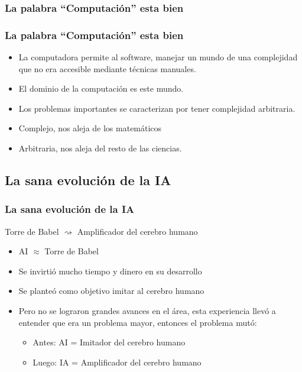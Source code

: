 \documentclass{beamer}
\begin{document}
\subsubsection{La palabra ``Computaci\'on''  esta bien}
    \begin{frame}
      \frametitle{La palabra ``Computaci\'on''  esta bien}
      \begin{itemize}
	\item La computadora permite al software, manejar un mundo de una complejidad que no era accesible mediante t\'ecnicas manuales.
	\item El dominio de la computaci\'on es este mundo.
	\item Los problemas importantes se caracterizan por tener complejidad arbitraria.
	\item Complejo,  nos aleja de los matem\'aticos
	\item Arbitraria, nos aleja del resto de las ciencias.  
  \end{itemize}    
\end{frame}



  \subsection{La sana evolución de la IA}
    \begin{frame}
      \frametitle{La sana evolución de la IA }
	\begin{block}{}
	    \begin{center}
	    Torre de Babel $\rightsquigarrow$ Amplificador del cerebro humano 
	    \end{center}	    
	\end{block}

	


 
	
      \begin{itemize}
	\item AI $\approx$ Torre de Babel
	\item Se invirtió mucho tiempo y dinero en su desarrollo
	\item Se planteó como objetivo imitar al cerebro humano
	\item Pero no se lograron grandes avances en el área, esta experiencia llevó a entender que era un problema mayor, entonces el problema mutó:
	\begin{itemize}
	  \item Antes: AI = Imitador del cerebro humano
	  \item Luego: IA = Amplificador del cerebro humano
	\end{itemize}
      \end{itemize}
    \end{frame}
\end{document}
